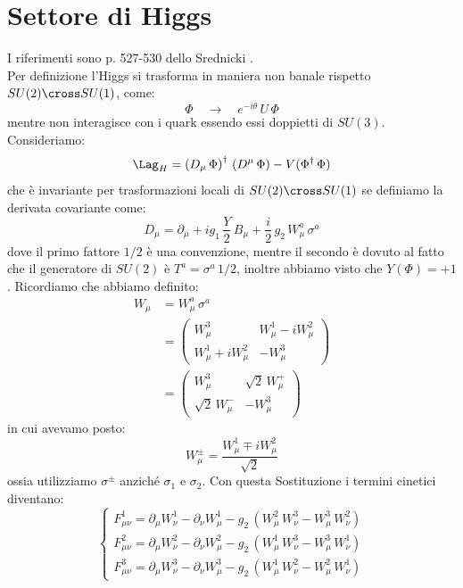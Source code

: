 \section{Settore di Higgs}

I riferimenti sono p. 527-530 dello Srednicki \cite{Srednicki}. \\

Per definizione l'Higgs si trasforma in maniera non banale rispetto $SU(2)\cross SU(1)$, come:
\begin{equation}
    \Phi \quad \longrightarrow \quad e^{-i\theta}\, U\, \Phi
\end{equation}
mentre non interagisce con i quark essendo essi doppietti di $SU(3)$. Consideriamo:
\begin{equation}
    \Lag_H = \left(D_\mu\, \Phi\right)^\dagger\, \left(D^\mu\, \Phi\right) - V(\Phi^\dagger\, \Phi)
\end{equation}
che è invariante per trasformazioni locali di $SU(2)\cross SU(1)$ se definiamo la derivata covariante come:
\begin{equation}
    D_\mu = \partial_\mu + ig_1\, \frac{Y}{2}\, B_\mu + \frac{i}{2}\, g_2\, W_\mu^a\, \sigma^a
\end{equation}
dove il primo fattore $1/2$ è una convenzione, mentre il secondo è dovuto al fatto che il generatore di $SU(2)$ è $T^a = \sigma^a\, 1/2$, inoltre abbiamo visto che $Y(\Phi) = +1$. Ricordiamo che abbiamo definito:
\begin{align}
    W_\mu &= W_\mu^a\, \sigma^a \\
    &= \begin{pmatrix}
        W_\mu^3 & W_\mu^1 - iW_\mu^2 \\
        W_\mu^1 + iW_\mu^2 & -W_\mu^3
    \end{pmatrix} \\
    &= \begin{pmatrix}
        W_\mu^3 & \sqrt{2}\, W_\mu^+ \\
        \sqrt{2}\, W_\mu^- & -W_\mu^3
    \end{pmatrix}
\end{align}
in cui avevamo posto:
\begin{equation}
    W_\mu^\pm = \frac{W_\mu^1 \mp iW_\mu^2}{\sqrt{2}}
\end{equation}
ossia utilizziamo $\sigma^\pm$ anziché $\sigma_1$ e $\sigma_2$. Con questa Sostituzione i termini cinetici diventano:
\begin{equation}
    \begin{cases}
        F_{\mu\nu}^1 = \partial_\mu W_\nu^1 - \partial_\nu W_\mu^1 - g_2\, \left( W_\mu^2\, W_\nu^3 - W_\mu^3\, W_\nu^2 \right) \\
        F_{\mu\nu}^2 = \partial_\mu W_\nu^2 - \partial_\nu W_\mu^2 - g_2\, \left( W_\mu^1\, W_\nu^3 - W_\mu^3\, W_\nu^1 \right) \\
        F_{\mu\nu}^3 = \partial_\mu W_\nu^3 - \partial_\nu W_\mu^3 - g_2\, \left( W_\mu^1\, W_\nu^2 - W_\mu^2\, W_\nu^1 \right)
    \end{cases}
\end{equation}
